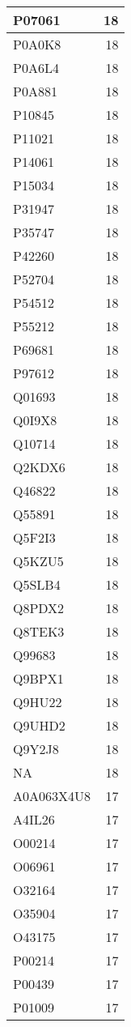 \documentclass[
]{book}
\theoremstyle{definition}
\theoremstyle{definition}
\theoremstyle{definition}
\theoremstyle{definition}
\theoremstyle{remark}
\begin{document}
\begin{table}
\begin{tabular}{l|r}
\hline
P07061 & 18\\
\hline
P0A0K8 & 18\\
\hline
P0A6L4 & 18\\
\hline
P0A881 & 18\\
\hline
P10845 & 18\\
\hline
P11021 & 18\\
\hline
P14061 & 18\\
\hline
P15034 & 18\\
\hline
P31947 & 18\\
\hline
P35747 & 18\\
\hline
P42260 & 18\\
\hline
P52704 & 18\\
\hline
P54512 & 18\\
\hline
P55212 & 18\\
\hline
P69681 & 18\\
\hline
P97612 & 18\\
\hline
Q01693 & 18\\
\hline
Q0I9X8 & 18\\
\hline
Q10714 & 18\\
\hline
Q2KDX6 & 18\\
\hline
Q46822 & 18\\
\hline
Q55891 & 18\\
\hline
Q5F2I3 & 18\\
\hline
Q5KZU5 & 18\\
\hline
Q5SLB4 & 18\\
\hline
Q8PDX2 & 18\\
\hline
Q8TEK3 & 18\\
\hline
Q99683 & 18\\
\hline
Q9BPX1 & 18\\
\hline
Q9HU22 & 18\\
\hline
Q9UHD2 & 18\\
\hline
Q9Y2J8 & 18\\
\hline
NA & 18\\
\hline
A0A063X4U8 & 17\\
\hline
A4IL26 & 17\\
\hline
O00214 & 17\\
\hline
O06961 & 17\\
\hline
O32164 & 17\\
\hline
O35904 & 17\\
\hline
O43175 & 17\\
\hline
P00214 & 17\\
\hline
P00439 & 17\\
\hline
P01009 & 17\\

\end{tabular}
\end{table}
\end{document}
